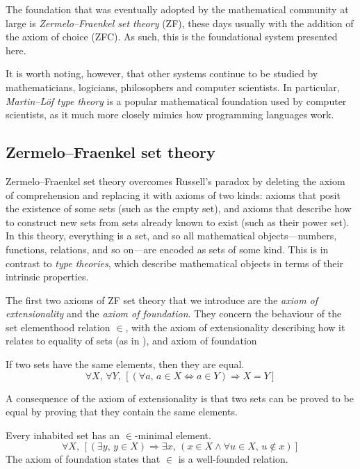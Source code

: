 The foundation that was eventually adopted by the mathematical community at large is \textit{Zermelo--Fraenkel set theory} (ZF), these days usually with the addition of the axiom of choice (ZFC). As such, this is the foundational system presented here.

It is worth noting, however, that other systems continue to be studied by mathematicians, logicians, philosophers and computer scientists. In particular, \textit{Martin--L\"{o}f type theory} is a popular mathematical foundation used by computer scientists, as it much more closely mimics how programming languages work.

\subsection*{Zermelo--Fraenkel set theory}

Zermelo--Fraenkel set theory overcomes Russell's paradox by deleting the axiom of comprehension and replacing it with axioms of two kinds: axioms that posit the existence of some sets (such as the empty set), and axioms that describe how to construct new sets from sets already known to exist (such as their power set). In this theory, everything is a set, and so all mathematical objects---numbers, functions, relations, and so on---are encoded as sets of some kind. This is in contrast to \textit{type theories}, which describe mathematical objects in terms of their intrinsic properties.

The first two axioms of ZF set theory that we introduce are the \textit{axiom of extensionality} and the \textit{axiom of foundation}. They concern the behaviour of the set elementhood relation $\in$, with the axiom of extensionality describing how it relates to equality of sets (as in ), and axiom of foundation 

\begin{axiom}
\label{axZFCExtensionality}
If two sets have the same elements, then they are equal.
\[ \forall X,\, \forall Y,\, [(\forall a,\, a \in X \Leftrightarrow a \in Y) \Rightarrow X=Y] \]
\end{axiom}

A consequence of the axiom of extensionality is that two sets can be proved to be equal by proving that they contain the same elements.

\begin{axiom}
Every inhabited set has an $\in$-minimal element.
\[ \forall X,\, [(\exists y,\, y \in X) \Rightarrow \exists x,\, (x \in X \wedge \forall u \in X,\, u \not \in x)] \]
The axiom of foundation states that $\in$ is a well-founded relation.
\end{axiom}

